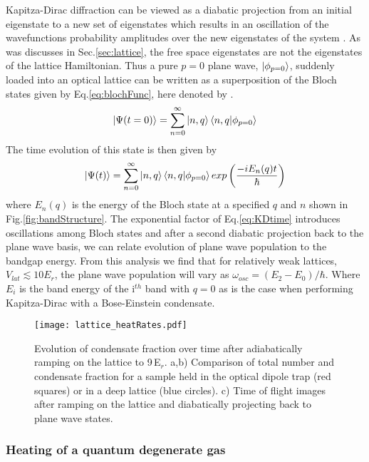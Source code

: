 	
Kapitza-Dirac diffraction can be viewed as a diabatic projection from an initial eigenstate to a new set of eigenstates which results in an oscillation of the wavefunctions probability amplitudes over the new eigenstates of the system \cite{Denschlag2002}. As was discusses in Sec.\;\ref{sec:lattice}, the free space eigenstates are not the eigenstates of the lattice Hamiltonian. Thus a pure $p=0$ plane wave, $\left| {\phi_{p=0}} \right>$, suddenly loaded into an optical lattice can be written as a superposition of the Bloch states given by Eq.\;\ref{eq:blochFunc}, here denoted by .
	\begin{equation} \label{eq:p0inBloch}
		\left| {\Psi(t=0)} \right> = \sum_{n=0}^{\infty} \left| {n,q} \right> \left< {n,q} | {\phi_{p=0}} \right>
	\end{equation}
The time evolution of this state is then given by
	\begin{equation} \label{eq:KDtime}
		\left| {\Psi(t)} \right> = \sum_{n=0}^{\infty} \left| {n,q} \right> \left< {n,q} | {\phi_{p=0}} \right> exp \left( \frac{-i E_n(q) t}{\hbar} \right)
	\end{equation}
where $E_n(q)$ is the energy of the Bloch state at a specified $q$ and $n$ shown in Fig.\;\ref{fig:bandStructure}. The exponential factor of Eq.\;\ref{eq:KDtime} introduces oscillations among Bloch states and after a second diabatic projection back to the plane wave basis, we can relate evolution of plane wave population to the bandgap energy. From this analysis we find that for relatively weak lattices, $V_{lat} \lesssim 10 E_r$, the plane wave population will vary as $\omega_{osc} = (E_2 - E_0) / \hbar$. Where $E_i$ is the band energy of the i$^{th}$ band with $q=0$ as is the case when performing Kapitza-Dirac with a Bose-Einstein condensate.


\begin{figure} \label{fig:heatingRates}
\centerline{
	\texttt{[image: lattice\_heatRates.pdf]}}
	\caption{Evolution of condensate fraction over time after adiabatically ramping on the lattice to 9\,E$_r$. a,b) Comparison of total number and condensate fraction for a sample held in the optical dipole trap (red squares) or in a deep lattice (blue circles). c) Time of flight images after ramping on the lattice and diabatically projecting back to plane wave states. }
\end{figure} 
	


\subsubsection{Heating of a quantum degenerate gas}

